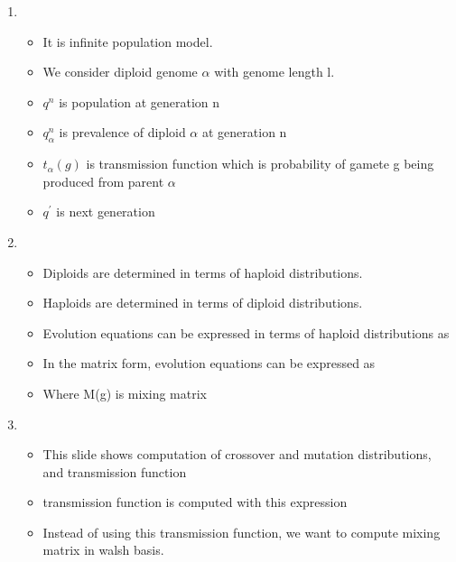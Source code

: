 \documentclass{article}
\begin{document}
\begin{enumerate}
\item
  \begin{itemize}
  \item It is infinite population model.
  \item We consider diploid genome $\alpha$ with genome length l.
  \item $q^n$ is population at generation n
  \item $q^n_\alpha$ is prevalence of diploid $\alpha$ at generation n
  \item $t_{\alpha}(g)$ is transmission function which is probability
    of gamete g being produced from parent $\alpha$
  \item $q^\prime$ is next generation
  \end{itemize}
    
\item
  \begin{itemize}
  \item Diploids are determined in terms of haploid
    distributions.
  \item Haploids are determined in terms of diploid
    distributions.
  \item Evolution equations can be expressed in terms of haploid
    distributions as
  \item In the matrix form, evolution equations can be expressed as
  \item Where M(g) is mixing matrix
  \end{itemize}
    
\item
  \begin{itemize}
  \item This slide shows computation of crossover and mutation
    distributions, and transmission function  
  \item transmission function is computed with this expression
  \item Instead of using this transmission function, we want to
    compute mixing matrix in walsh basis.
  \end{itemize}
    

\end{enumerate}
\end{document}
